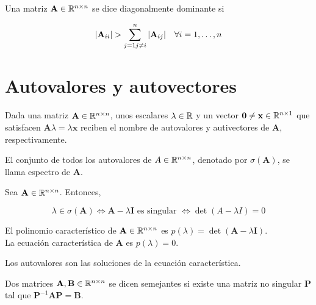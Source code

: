 \begin{defi}\label{def:diagonalmente_dominante}
Una matriz $\mathbf{A} \in \mathbb{R}^{n \times n}$ se dice diagonalmente dominante si 

\[ |\mathbf{A}_{ii}| > \sum_{j=1 \\ j \neq i}^{n} |\mathbf{A}_{ij}| \quad \forall i = 1,\dots, n \]
\end{defi}



\section{Autovalores y autovectores}
\begin{defi}
Dada una matriz $\mathbf{A} \in \mathbb{R}^{n \times n}$, unos escalares $\lambda \in \mathbb{R}$ y un vector $\mathbf{0} \neq \mathbf{x} \in \mathbb{R}^{n \times 1}$ que satisfacen $\mathbf{A} \lambda = \lambda \mathbf{x}$ reciben el nombre de autovalores y autivectores de $\mathbf{A}$, respectivamente.
\end{defi}

\begin{defi}
El conjunto de todos los autovalores de $A \in \mathbb{R}^{n \times n}$, denotado por $\sigma(\mathbf{A})$, se llama espectro de $\mathbf{A}$.
\end{defi}

\begin{prop}
Sea $\mathbf{A} \in \mathbb{R}^{n \times n}$. Entonces,

\[ \lambda \in \sigma(\mathbf{A}) \iff \mathbf{A} - \lambda \mathbf{I} \text{ es singular } \iff \det(A - \lambda I) = 0 \] 
\end{prop}

\begin{defi}
El polinomio característico de $\mathbf{A} \in \mathbb{R}^{n \times n}$ es $p(\lambda) = \det(\mathbf{A} - \lambda \mathbf{I})$.\\

La ecuación característica de $\mathbf{A}$ es $p(\lambda) = 0$.
\end{defi}

\begin{defi}
Los autovalores son las soluciones de la ecuación característica.
\end{defi}

\begin{defi}
Dos matrices $\mathbf{A}, \mathbf{B} \in \mathbb{R}^{n \times n}$ se dicen semejantes si existe una matriz no singular $\mathbf{P}$ tal que $\mathbf{P}^{-1}\mathbf{A} \mathbf{P} = \mathbf{B}$.
\end{defi}

